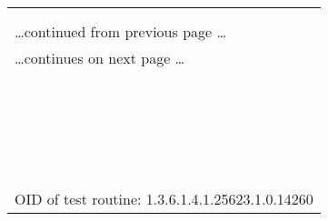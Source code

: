 \documentclass{article}
\begin{document}
\begin{longtable}{|p{}|}
\hline
\rowcolor{openvas_note}{\color{white}{Low (CVSS: 0.0) }}\\
\rowcolor{openvas_note}{\color{white}{NVT: Nikto (NASL wrapper)}}\\
\hline
\endfirsthead
\hfill\ldots continued from previous page \ldots \\
\hline
\endhead
\hline
\ldots continues on next page \ldots \\
\endfoot
\hline
\endlastfoot
\\
\rowcolor{white}{\verb=Here is the Nikto report:=}\\
\rowcolor{white}{\verb=- Nikto v2.1.6=}\\
\rowcolor{white}{\verb=---------------------------------------------------------------------------=}\\
\rowcolor{white}{\verb=+ Target IP:          192.168.248.129=}\\
\rowcolor{white}{\verb=+ Target Hostname:    192.168.248.129=}\\
\rowcolor{white}{\verb=+ Target Port:        80=}\\
\rowcolor{white}{\verb=+ Start Time:         2014-10-27 02:44:59 (GMT0)=}\\
\rowcolor{white}{\verb=---------------------------------------------------------------------------=}\\
\rowcolor{white}{\verb=+ Server: lighttpd/1.4.26=}\\
\rowcolor{white}{\verb=+ Server leaks inodes via ETags, header found with file /, fields: 0x1568625240 =}\\
\rowcolor{white}{\verb=+ The anti-clickjacking X-Frame-Options header is not present.=}\\
\rowcolor{white}{\verb=+ No CGI Directories found (use '-C all' to force check all possible dirs)=}\\
\rowcolor{white}{\verb=+ Allowed HTTP Methods: OPTIONS, GET, HEAD, POST =}\\
\rowcolor{white}{\verb=+ 6604 requests: 0 error(s) and 3 item(s) reported on remote host=}\\
\rowcolor{white}{\verb=+ End Time:           2014-10-27 02:45:26 (GMT0) (27 seconds)=}\\
\rowcolor{white}{\verb=---------------------------------------------------------------------------=}\\
\rowcolor{white}{\verb=+ 1 host(s) tested=}\\
\rowcolor{white}{\verb==}\\
\rowcolor{white}{\verb==}\\
\\
OID of test routine: 1.3.6.1.4.1.25623.1.0.14260\\
\end{longtable}
\end{document}
